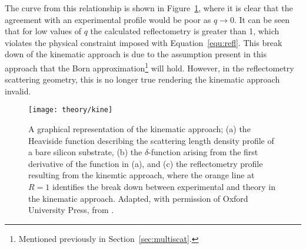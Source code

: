 %
The curve from this relationship is shown in Figure~\ref{fig:kine}, where it is clear that the agreement with an experimental profile would be poor as $q \rightarrow 0$.
It can be seen that for low values of $q$ the calculated reflectometry is greater than 1, which violates the physical constraint imposed with Equation~\ref{equ:refl}.
This break down of the kinematic approach is due to the assumption present in this approach that the Born approximation\footnote{Mentioned previously in Section~\ref{sec:multiscat}.} will hold.
However, in the reflectometry scattering geometry, this is no longer true rendering the kinematic approach invalid.
%
\begin{figure}
    \centering
    \texttt{[image: theory/kine]}
    \caption{A graphical representation of the kinematic approach; (a) the Heaviside function describing the scattering length density profile of a bare silicon substrate, (b) the $\delta$-function arising from the first derivative of the function in (a), and (c) the reflectometry profile resulting from the kinemtic approach, where the orange line at $R=1$ identifies the break down between experimental and theory in the kinematic approach. Adapted, with permission of Oxford University Press, from \cite{sivia_elementary_2011}.}
    \label{fig:kine}
\end{figure}
%

